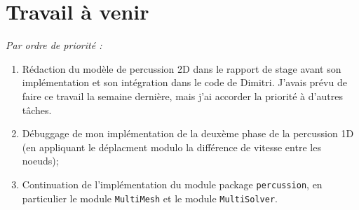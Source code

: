 \documentclass[
  french,
	11pt, %
]{fphw}
\begin{document}
\section*{Travail à venir}

\emph{Par ordre de priorité :}
\begin{enumerate}
  \item Rédaction du modèle de percussion 2D dans le rapport de stage avant son implémentation et son intégration dans le code de Dimitri. J'avais prévu de faire ce travail la semaine dernière, mais j'ai accorder la priorité à d'autres tâches.
  \item Débuggage de mon implémentation de la deuxème phase de la percussion 1D (en appliquant le déplacment modulo la différence de vitesse entre les noeuds);
  \item Continuation de l'implémentation du module package \texttt{percussion}, en particulier le module \texttt{MultiMesh} et le module \texttt{MultiSolver}. 
\end{enumerate}


 
\clearpage   %
\printbibliography
\end{document}
